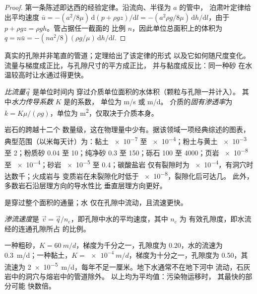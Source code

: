 \begin{proof}
第一条陈述即达西的经验定律。沿流向、半径为 $a$ 的管中，
泊肃叶定律给出平均速度 $\bar u =
-(a^2/8\mu)\,\mathrm d(p + \rho gz)/\mathrm dl = -(a^2\rho g/8\mu)\,\mathrm
dh/\mathrm dl$，由于 $p + \rho gz = \rho g h$。管占据任一截面的
比例 $n$，因此单位总面积上的体积为
$q = n\bar u = -(na^2/8)(\rho g/\mu)\,\mathrm dh/\mathrm dl$.
\end{proof}

真实的孔隙并非笔直的管道；定理给出了该定律的形式
以及它如何随尺度变化。流量与梯度成正比，与孔隙尺寸的平方成正比，
并与黏度成反比：同一种砂
在水温较高时让水通过得更快。

\begin{definition}\label{def:b3:hydrogeology:darcy}
\emph{比流量}$\vec q$ 是单位时间内
穿过介质单位面积的水体积（颗粒与孔隙一并计入）。
其中\emph{水力传导系数}
$K$ 是的系数，
单位为 \unit{m/s} 或 \unit{m/d}。
介质的\emph{固有渗透率}为 $k =
K\mu/(\rho g)$，单位为 \unit{m^2}，仅取决于介质本身。
\end{definition}

岩石的跨越十二个
数量级，这在物理量中少有。据该领域一项经典综述的图表，
典型范围（以米每天计）为：黏土
\num{e-7} 至 \num{e-4}；粉土与黄土 \num{e-3} 至 2；粉质砂 0.04 至
10；纯净砂 0.3 至 150；砾石 100 至 4000；页岩 \num{e-8} 至
\num{e-4}；砂岩 \num{e-5} 至 0.4；碳酸盐岩
仅有裂隙时为 \num{e-4}，有洞穴时达数千；火成岩与
变质岩在未裂隙化时低于 \num{e-8}，裂隙化后可达几。
此外，多数岩石沿层理方向的导水性比
垂直层理方向更好。

是穿过整个面积的通量；水
仅在孔隙中流动，且流速更快。

\begin{definition}[渗流速度]\label{def:b3:hydrogeology:seepage}
\emph{渗流速度}是 $\vec v = \vec
q/n_e$，即孔隙中水的平均速度，其中 $n_e$ 为
有效孔隙度，即水流经的连通孔隙所占
的比例。
\end{definition}

一种粗砂，$K = \qty{60}{m/d}$，梯度为千分之一，孔隙度为 0.20，水的流速为 \qty{0.3}{m/d}；一种黏土，$K =
\qty{e-4}{m/d}$，梯度为十分之一，孔隙度为 0.50，其流速为
\qty{2e-5}{m/d}，每年不足一厘米。地下水通常不在地下河中
流动，石灰岩中的洞穴与熔岩中的管道除外。
以上均为平均值：污染物运移时，
其最快的部分可能
快数倍。

